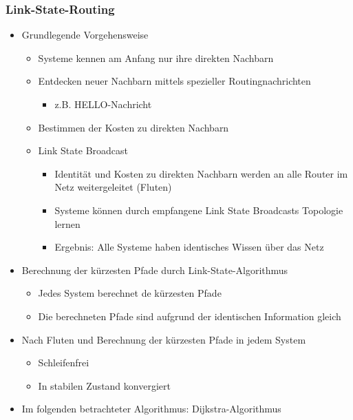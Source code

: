     \subsubsection{Link-State-Routing}
      \begin{itemize}
        \item Grundlegende Vorgehensweise
          \begin{itemize}
            \item Systeme kennen am Anfang nur ihre direkten Nachbarn
            \item Entdecken neuer Nachbarn mittels spezieller Routingnachrichten
              \begin{itemize}
                \item z.B. HELLO-Nachricht
              \end{itemize}
            \item Bestimmen der Kosten zu direkten Nachbarn
            \item Link State Broadcast
              \begin{itemize}
                \item Identität und Kosten zu direkten Nachbarn werden an alle Router im Netz
                  weitergeleitet (Fluten)
                \item Systeme können durch empfangene Link State Broadcasts Topologie lernen
                \item Ergebnis: Alle Systeme haben identisches Wissen über das Netz
              \end{itemize}
          \end{itemize}
        \item Berechnung der kürzesten Pfade durch Link-State-Algorithmus
          \begin{itemize}
            \item Jedes System berechnet de kürzesten Pfade
            \item Die berechneten Pfade sind aufgrund der identischen Information gleich
          \end{itemize}
        \item Nach Fluten und Berechnung der kürzesten Pfade in jedem System
          \begin{itemize}
            \item Schleifenfrei
            \item In stabilen Zustand konvergiert
          \end{itemize}
        \item Im folgenden betrachteter Algorithmus: Dijkstra-Algorithmus

\end{itemize}
